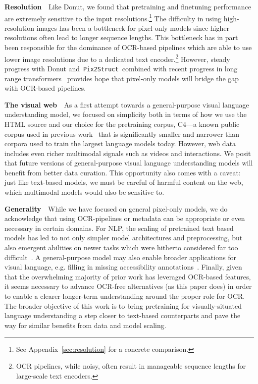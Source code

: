 \documentclass{article} \usepackage[accepted]{icml2023}
\newcommand\ourmodel{{\texttt{Pix2Struct}}}
\begin{document}
\textbf{Resolution}~~Like Donut, we found that pretraining and finetuning performance are extremely sensitive to the input resolutions.\footnote{See Appendix~\ref{sec:resolution} for a concrete comparison.} The difficulty in using high-resolution images has been a bottleneck for pixel-only models since higher resolutions often lead to longer sequence lengths. This bottleneck has in part been responsible for the dominance of OCR-based pipelines which are able to use lower image resolutions due to a dedicated text encoder.\footnote{OCR pipelines, while noisy, often result in manageable sequence lengths for large-scale text encoders.} However, steady progress with Donut and~\ourmodel~combined with recent progress in long range transformers~\citep{press2021train} provides hope that pixel-only models will bridge the gap with OCR-based pipelines.

\textbf{The visual web}~~As a first attempt towards a general-purpose visual language understanding model, we focused on simplicity both in terms of how we use the HTML source and our choice for the pretraining corpus, C4---a known public corpus used in previous work~\citep{t5} that is significantly smaller and narrower than corpora used to train the largest language models today. However, web data includes even richer multimodal signals such as videos and interactions. We posit that future versions of general-purpose visual language understanding models will benefit from better data curation. This opportunity also comes with a caveat: just like text-based models, we must be careful of harmful content on the web, which multimodal models would also be sensitive to.

\textbf{Generality}~~While we have focused on general pixel-only models, we do acknowledge that using OCR-pipelines or metadata can be appropriate or even necessary in certain domains. 
For NLP, the scaling of pretrained text based models has led to not only simpler model architectures and preprocessing, but also emergent abilities on newer tasks which were hitherto considered far too difficult~\citep{wei2022emergent}. A general-purpose model may also enable broader applications for visual language, e.g. filling in missing accessibility annotations~\citep{zhang2021screen}. 
Finally, given that the overwhelming majority of prior work has leveraged OCR-based features, it seems necessary to advance OCR-free alternatives (as this paper does) in order to enable a clearer longer-term understanding around the proper role for OCR.
The broader objective of this work is to bring pretraining for visually-situated language understanding a step closer to text-based counterparts and pave the way for similar benefits from data and model scaling. 
\end{document}
